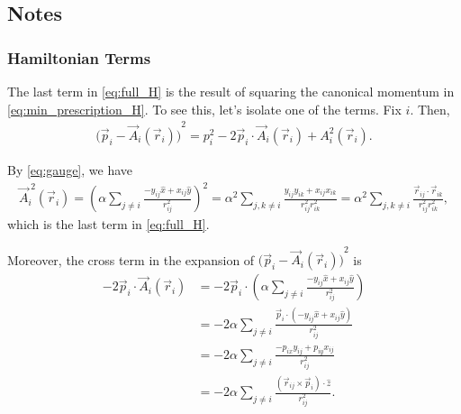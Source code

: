 \subsection{Notes}
\subsubsection{Hamiltonian Terms}
The last term in \cref{eq:full_H} is the result of squaring the canonical momentum in \cref{eq:min_prescription_H}. To see this, let's isolate one of the terms. Fix $i$. Then,
\begin{align*}
    {\bigl(\vec{p}_i - \vec{A}_i(\vec{r}_i)\bigr)}^2 = {p}_i^{2} - 2\vec{p}_i\cdot\vec{A}_i(\vec{r}_i) + {A}_i^{2}(\vec{r}_i).
\end{align*}

By \cref{eq:gauge}, we have
\begin{align*}
    \vec{A}_i^{\;2}(\vec{r}_i) = {\left( \alpha\sum_{j\neq i}\frac{-y_{ij}\hat{x} + x_{ij}\hat{y}}{r_{ij}^2} \right)}^2 = \alpha^2\sum_{j,k\neq i}\frac{y_{ij}y_{ik} + x_{ij}x_{ik}}{r_{ij}^2r_{ik}^2} = \alpha^2\sum_{j,k\neq i}\frac{\vec{r}_{ij}\cdot\vec{r}_{ik}}{r_{ij}^2r_{ik}^2},
\end{align*}
which is the last term in \cref{eq:full_H}.

Moreover, the cross term in the expansion of ${\bigl(\vec{p}_i - \vec{A}_i(\vec{r}_i)\bigr)}^2$ is
\begin{align*}
    -2\vec{p}_i\cdot\vec{A}_i(\vec{r}_i) &= -2\vec{p}_i\cdot\left( \alpha\sum_{j\neq i}\frac{-y_{ij}\hat{x} + x_{ij}\hat{y}}{r_{ij}^2} \right) \\
    &= -2\alpha\sum_{j\neq i}\frac{\vec{p}_i\cdot\left( -y_{ij}\hat{x} + x_{ij}\hat{y} \right)}{r_{ij}^2} \\
    &= -2\alpha\sum_{j\neq i}\frac{-p_{ix}y_{ij} + p_{iy}x_{ij}}{r_{ij}^2} \\
    &= -2\alpha\sum_{j\neq i}\frac{(\vec{r}_{ij}\times\vec{p}_i)\cdot\hat{z}}{r_{ij}^2}.
\end{align*}

